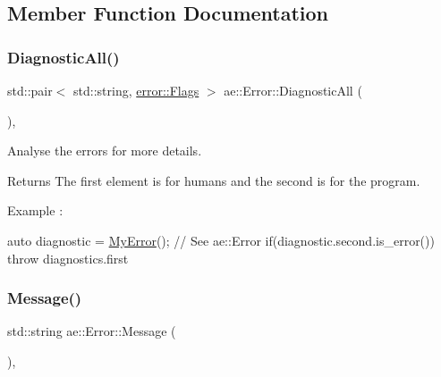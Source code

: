 \subsection{Member Function Documentation}
\hypertarget{classae_1_1_error_ab6172fe7f6627dd726223bd4bd923693}{}\label{classae_1_1_error_ab6172fe7f6627dd726223bd4bd923693} 
\subsubsection{\texorpdfstring{Diagnostic\+All()}{DiagnosticAll()}}
{\footnotesize\ttfamily std\+::pair$<$ std\+::string, \hyperlink{structae_1_1error_1_1_flags}{error\+::\+Flags} $>$ ae\+::\+Error\+::\+Diagnostic\+All (\begin{DoxyParamCaption}{ }\end{DoxyParamCaption})\hspace{0.3cm}{\ttfamily [virtual]}, {\ttfamily [noexcept]}}



Analyse the errors for more details. 

\begin{DoxyReturn}{Returns}
The first element is for humans and the second is for the program.
\end{DoxyReturn}
Example \+:


\begin{DoxyCode}
\textcolor{keyword}{auto} diagnostic = \hyperlink{class_my_error}{MyError}(); \textcolor{comment}{// See ae::Error}
\textcolor{keywordflow}{if}(diagnostic.second.is\_error())
\textcolor{keywordflow}{throw} diagnostics.first
\end{DoxyCode}
 \hypertarget{classae_1_1_error_a5390c80f9eed13d8b4fce01468395187}{}\label{classae_1_1_error_a5390c80f9eed13d8b4fce01468395187} 
\subsubsection{\texorpdfstring{Message()}{Message()}}
{\footnotesize\ttfamily std\+::string ae\+::\+Error\+::\+Message (\begin{DoxyParamCaption}{ }\end{DoxyParamCaption})\hspace{0.3cm}{\ttfamily [virtual]}, {\ttfamily [noexcept]}}



